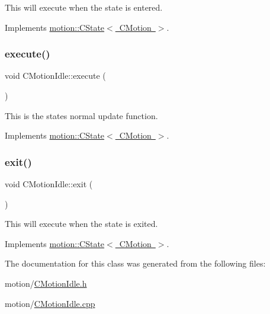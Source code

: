 This will execute when the state is entered. 

Implements \mbox{\hyperlink{classmotion_1_1CState_a53d5fcfec223b58ccdd364a8430fd23c}{motion\+::\+C\+State$<$ C\+Motion $>$}}.

\mbox{\label{classmotion_1_1CMotionIdle_aad314bae00925e2fdbbf8e93fff08b9a}} 
\subsubsection{\texorpdfstring{execute()}{execute()}}
{\footnotesize\ttfamily void C\+Motion\+Idle\+::execute (\begin{DoxyParamCaption}\item[{\mbox{\hyperlink{classmotion_1_1CMotion}{C\+Motion}} $\ast$}]{ }\end{DoxyParamCaption})\hspace{0.3cm}{\ttfamily [virtual]}}

This is the states normal update function. 

Implements \mbox{\hyperlink{classmotion_1_1CState_a71dc72d345b15bf3b5b5bff596a71f33}{motion\+::\+C\+State$<$ C\+Motion $>$}}.

\mbox{\label{classmotion_1_1CMotionIdle_a2488eb5516673fd8e188da01a9e4bc51}} 
\subsubsection{\texorpdfstring{exit()}{exit()}}
{\footnotesize\ttfamily void C\+Motion\+Idle\+::exit (\begin{DoxyParamCaption}\item[{\mbox{\hyperlink{classmotion_1_1CMotion}{C\+Motion}} $\ast$}]{ }\end{DoxyParamCaption})\hspace{0.3cm}{\ttfamily [virtual]}}

This will execute when the state is exited. 

Implements \mbox{\hyperlink{classmotion_1_1CState_a353db064c159d66b82bf257b35e7c016}{motion\+::\+C\+State$<$ C\+Motion $>$}}.



The documentation for this class was generated from the following files\+:\begin{DoxyCompactItemize}
\item 
motion/\mbox{\hyperlink{CMotionIdle_8h}{C\+Motion\+Idle.\+h}}\item 
motion/\mbox{\hyperlink{CMotionIdle_8cpp}{C\+Motion\+Idle.\+cpp}}\end{DoxyCompactItemize}
